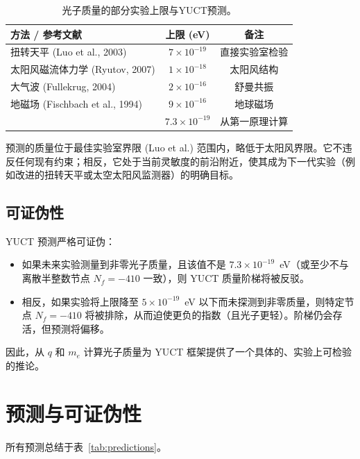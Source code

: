 \documentclass[12pt,a4paper]{article}
\begin{document}
	\begin{table}[H]
		\centering
		\caption{光子质量的部分实验上限与YUCT预测。}
		\label{tab:photon_limits}
		\begin{tabular}{lcc}
			\toprule
			\textbf{方法 / 参考文献} & \textbf{上限 (eV)} & \textbf{备注} \\
			\midrule
			扭转天平 (Luo et al., 2003) & \(7\times10^{-19}\) & 直接实验室检验 \\
			太阳风磁流体力学 (Ryutov, 2007) & \(1\times10^{-18}\) & 太阳风结构 \\
			大气波 (Fullekrug, 2004) & \(2\times10^{-16}\) & 舒曼共振 \\
			地磁场 (Fischbach et al., 1994) & \(9\times10^{-16}\) & 地球磁场 \\
			\addlinespace
			\multicolumn{1}{c}{\textbf{YUCT 预测}} & \multicolumn{1}{c}{\(7.3\times10^{-19}\)} & 从第一原理计算 \\
			\bottomrule
		\end{tabular}
	\end{table}
	
	预测的质量位于最佳实验室界限 (Luo et al.) 范围内，略低于太阳风界限。它不违反任何现有约束；相反，它处于当前灵敏度的前沿附近，使其成为下一代实验（例如改进的扭转天平或太空太阳风监测器）的明确目标。
	
	\subsection{可证伪性}
	
	YUCT 预测严格可证伪：
	\begin{itemize}
		\item 如果未来实验测量到非零光子质量，且该值不是 \(7.3\times10^{-19}\)~eV（或至少不与离散半整数节点 \(N_f = -410\) 一致），则 YUCT 质量阶梯将被反驳。
		\item 相反，如果实验将上限降至 \(5\times10^{-19}\)~eV 以下而未探测到非零质量，则特定节点 \(N_f = -410\) 将被排除，从而迫使更负的指数（且光子更轻）。阶梯仍会存活，但预测将偏移。
	\end{itemize}
	因此，从 \(q\) 和 \(m_e\) 计算光子质量为 YUCT 框架提供了一个具体的、实验上可检验的推论。
	
	\section{预测与可证伪性}
	
	所有预测总结于表~\ref{tab:predictions}。
	
\end{document}
